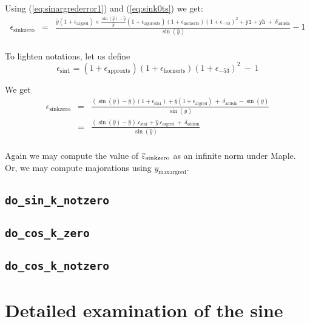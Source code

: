 Using (\ref{eq:sinargrederror1}) and (\ref{eq:sink0ts}) we get:
\begin{eqnarray*}
  \epsilon_{\mathrm{sinkzero}} 
  &=& \frac{\hat{y}(1+\epsilon_{\mathrm{argred}})\times\frac{\sin(\hat{y})-\hat{y}}{\hat{y}}(1+\epsilon_{\mathrm{approxts}})(1+\epsilon_{\mathrm{hornerts}})(1+\epsilon_{-53})^2 + \mathtt{yl} + \mathtt{yh}    \ +\  \delta_{\mathrm{addsin}} }{\sin(\hat{y})} -1\\
\end{eqnarray*}

To lighten notations, let us define 
\begin{equation}
 \epsilon_{\mathrm{sin1}} = (1+\epsilon_{\mathrm{approxts}})(1+\epsilon_{\mathrm{hornerts}})(1+\epsilon_{-53})^2 \ -\ 1
  \label{eq:epssin1}
\end{equation}

We get
\begin{eqnarray*}
  \epsilon_{\mathrm{sinkzero}} 
  &=& \frac{(\sin(\hat{y})-\hat{y})(1+\epsilon_{\mathrm{sin1}}) + \hat{y}(1+\epsilon_{\mathrm{argred}})    \ +\   \delta_{\mathrm{addsin}} - \sin(\hat{y})}{\sin(\hat{y})}\\
  &=& \frac{(\sin(\hat{y})-\hat{y}).\epsilon_{\mathrm{sin1}} + \hat{y}.\epsilon_{\mathrm{argred}}    \ +\ \delta_{\mathrm{addsin}}}{\sin(\hat{y})}\\
\label{eq:sinkzero}
\end{eqnarray*}

Again we may compute the value of ${\overline{\varepsilon}}_{\mathrm{sinkzero}}$ as an
infinite norm under Maple. Or, we may compute majorations using
$y_{\mathrm{maxargred}}$.

 



\subsection{\texttt{do\_sin\_k\_notzero}}


\subsection{\texttt{do\_cos\_k\_zero}}


\subsection{\texttt{do\_cos\_k\_notzero}}



\section{Detailed examination of the sine}

